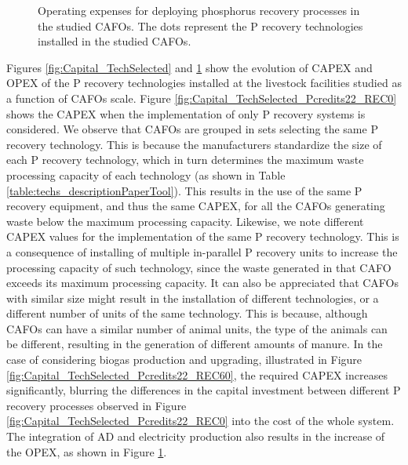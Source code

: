 \begin{refsection}[referencesCh4]
\begin{figure}[h!]
	\caption{Operating expenses for deploying phosphorus recovery processes in the studied CAFOs. The dots represent the P recovery technologies installed in the studied CAFOs.}
	\label{fig:OPEX_TechSelected}
\end{figure}

Figures \ref{fig:Capital_TechSelected} and \ref{fig:OPEX_TechSelected} show the evolution of CAPEX and OPEX of the P recovery technologies installed at the livestock facilities studied as a function of CAFOs scale. Figure \ref{fig:Capital_TechSelected_Pcredits22_REC0} shows the CAPEX when the implementation of only P recovery systems is considered. We observe that CAFOs are grouped in sets selecting the same P recovery technology. This is because the manufacturers standardize the size of each P recovery technology, which in turn determines the maximum waste processing capacity of each technology (as shown in Table \ref{table:techs_descriptionPaperTool}). This results in the use of the same P recovery equipment, and thus the same CAPEX, for all the CAFOs generating waste below the maximum processing capacity. Likewise, we note different CAPEX values for the implementation of the same P recovery technology. This is a consequence of installing of multiple in-parallel P recovery units to increase the processing capacity of such technology, since the waste generated in that CAFO exceeds its maximum processing capacity. It can also be appreciated that CAFOs with similar size might result in the installation of different technologies, or a different number of units of the same technology.
This is because, although CAFOs can have a similar number of animal units, the type of the animals can be different, resulting in the generation of different amounts of manure. 
In the case of considering biogas production and upgrading, illustrated in Figure \ref{fig:Capital_TechSelected_Pcredits22_REC60}, the required CAPEX increases significantly, blurring the differences in the capital investment between different P recovery processes observed in Figure \ref{fig:Capital_TechSelected_Pcredits22_REC0} into the cost of the whole system. The integration of AD and electricity production also results in the increase of the OPEX, as shown in Figure \ref{fig:OPEX_TechSelected}.


\end{refsection}
